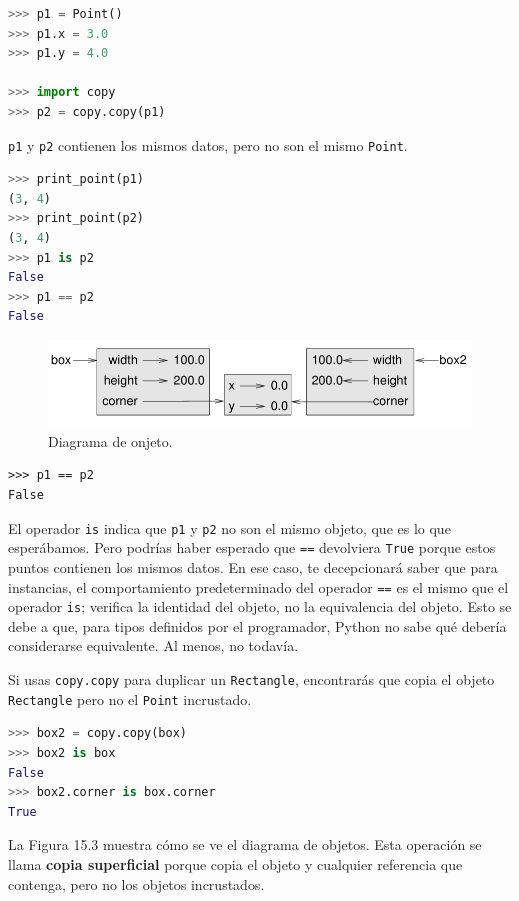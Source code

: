 \begin{lstlisting}[language=Python]
>>> p1 = Point()
>>> p1.x = 3.0
>>> p1.y = 4.0

>>> import copy
>>> p2 = copy.copy(p1)
\end{lstlisting}

\texttt{p1} y \texttt{p2} contienen los mismos datos, pero no son el mismo \texttt{Point}.

\begin{lstlisting}[language=Python]
>>> print_point(p1)
(3, 4)
>>> print_point(p2)
(3, 4)
>>> p1 is p2
False
>>> p1 == p2
False
\end{lstlisting}

\begin{figure}[h]
\centering
\includegraphics[width=0.7\linewidth]{images/chapter_15_3.png} %
\caption{Diagrama de onjeto.}
\label{fig:diagrama_estado}
\end{figure}

\begin{lstlisting}
>>> p1 == p2
False
\end{lstlisting}
El operador \texttt{is} indica que \texttt{p1} y \texttt{p2} no son el mismo objeto, que es lo que esperábamos. Pero podrías haber esperado que \texttt{==} devolviera \texttt{True} porque estos puntos contienen los mismos datos. En ese caso, te decepcionará saber que para instancias, el comportamiento predeterminado del operador \texttt{==} es el mismo que el operador \texttt{is}; verifica la identidad del objeto, no la equivalencia del objeto. Esto se debe a que, para tipos definidos por el programador, Python no sabe qué debería considerarse equivalente. Al menos, no todavía.

Si usas \texttt{copy.copy} para duplicar un \texttt{Rectangle}, encontrarás que copia el objeto \texttt{Rectangle} pero no el \texttt{Point} incrustado.

\begin{lstlisting}[language=Python]
>>> box2 = copy.copy(box)
>>> box2 is box
False
>>> box2.corner is box.corner
True
\end{lstlisting}

La Figura 15.3 muestra cómo se ve el diagrama de objetos. Esta operación se llama \textbf{copia superficial} porque copia el objeto y cualquier referencia que contenga, pero no los objetos incrustados.

